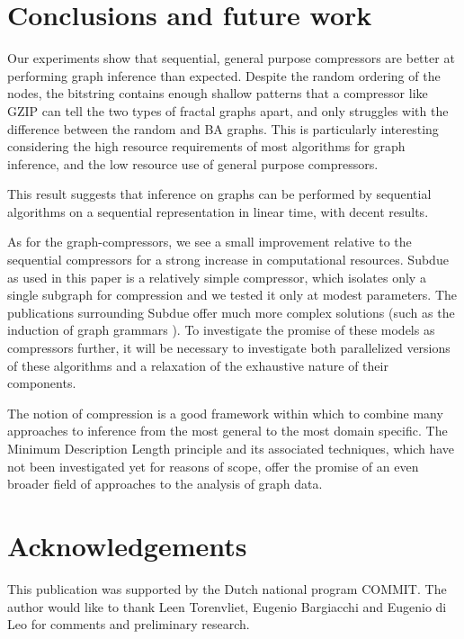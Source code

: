 \documentclass{article}
\begin{document}

\section*{Conclusions and future work}

Our experiments show that sequential, general purpose compressors are better at performing graph inference than expected. Despite the random ordering of the nodes, the bitstring contains enough shallow patterns that a compressor like GZIP can tell the two types of fractal graphs apart, and only struggles with the difference between the random and BA graphs. This is particularly interesting considering the high resource requirements of most algorithms for graph inference, and the low resource use of general purpose compressors. 

This result suggests that inference on graphs can be performed by sequential algorithms on a sequential representation in linear time, with decent results.

As for the graph-compressors, we see a small improvement relative to the sequential compressors for a strong increase in computational resources. Subdue as used in this paper is a relatively simple compressor, which isolates only a single subgraph for compression and we tested it only at modest parameters. The publications surrounding Subdue offer much more complex solutions (such as the induction of graph grammars \cite{jonyer2004mdl}). To investigate the promise of these models as compressors further, it will be necessary to investigate both parallelized versions of these algorithms and a relaxation of the exhaustive nature of their components. 

The notion of compression is a good framework within which to combine many approaches to inference from the most general to the most domain specific. The Minimum Description Length principle and its associated techniques, which have not been investigated yet for reasons of scope, offer the promise of an even broader field of approaches to the analysis of graph data.

\pagebreak

\section*{Acknowledgements}

This publication was supported by the Dutch national program COMMIT. The author would like to thank Leen Torenvliet, Eugenio Bargiacchi and Eugenio di Leo for comments and preliminary research.

 

\end{document}
